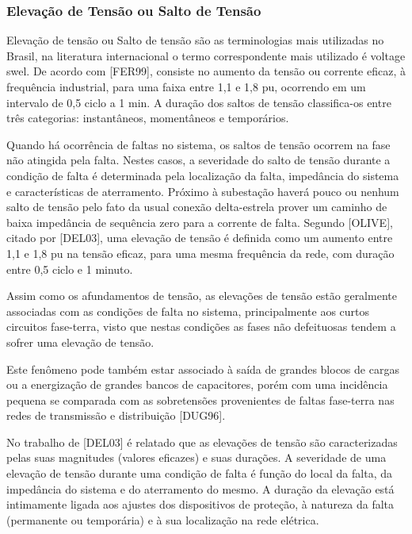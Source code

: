 \subsubsection{Elevação de Tensão ou Salto de Tensão}
\par
Elevação de tensão ou Salto de tensão são as terminologias mais utilizadas no Brasil, na literatura internacional o termo correspondente mais utilizado é voltage swel. De acordo com [FER99], consiste no aumento da tensão ou corrente eficaz, à frequência industrial, para uma faixa entre 1,1 e 1,8 pu, ocorrendo em um intervalo de 0,5 ciclo a 1 min. A duração dos saltos de tensão classifica-os entre três categorias: instantâneos, momentâneos e temporários.
\par
Quando há ocorrência de faltas no sistema, os saltos de tensão ocorrem na fase não atingida pela falta. Nestes casos, a severidade do salto de tensão durante a condição de falta é determinada pela localização da falta, impedância do sistema e características de aterramento. Próximo à subestação haverá pouco ou nenhum salto de tensão pelo fato da usual conexão delta-estrela prover um caminho de baixa impedância de sequência zero para a corrente de falta. Segundo [OLIVE], citado por [DEL03], uma elevação de tensão é definida como um aumento entre 1,1 e 1,8 pu na tensão eficaz, para uma mesma frequência da rede, com duração entre 0,5 ciclo e 1 minuto.
\par
Assim como os afundamentos de tensão, as elevações de tensão estão geralmente associadas com as condições de falta no sistema, principalmente aos curtos circuitos fase-terra, visto que nestas condições as fases não defeituosas tendem a sofrer uma elevação de tensão.
\par
Este fenômeno pode também estar associado à saída de grandes blocos de cargas ou a energização de grandes bancos de capacitores, porém com uma incidência pequena se comparada com as sobretensões provenientes de faltas fase-terra nas redes de transmissão e distribuição [DUG96].
\par
No trabalho de [DEL03] é relatado que as elevações de tensão são caracterizadas pelas suas magnitudes (valores eficazes) e suas durações. A severidade de uma elevação de tensão durante uma condição de falta é função do local da falta, da impedância do sistema e do aterramento do mesmo. A duração da elevação está intimamente ligada aos ajustes dos dispositivos de proteção, à natureza da falta (permanente ou temporária) e à sua localização na rede elétrica.
\par
